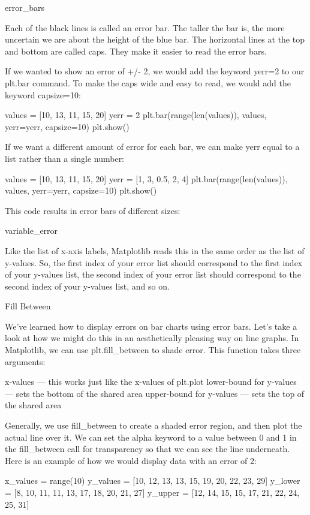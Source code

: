 \documentclass{journal}
\begin{document}
error_bars

Each of the black lines is called an error bar. The taller the bar is, the more uncertain we are about the height of the blue bar. The horizontal lines at the top and bottom are called caps. They make it easier to read the error bars.

If we wanted to show an error of +/- 2, we would add the keyword yerr=2 to our plt.bar command. To make the caps wide and easy to read, we would add the keyword capsize=10:

values = [10, 13, 11, 15, 20]
yerr = 2
plt.bar(range(len(values)), values, yerr=yerr, capsize=10)
plt.show()

If we want a different amount of error for each bar, we can make yerr equal to a list rather than a single number:

values = [10, 13, 11, 15, 20]
yerr = [1, 3, 0.5, 2, 4]
plt.bar(range(len(values)), values, yerr=yerr, capsize=10)
plt.show()

This code results in error bars of different sizes:

variable_error

Like the list of x-axis labels, Matplotlib reads this in the same order as the list of y-values. So, the first index of your error list should correspond to the first index of your y-values list, the second index of your error list should correspond to the second index of your y-values list, and so on.



Fill Between

We’ve learned how to display errors on bar charts using error bars. Let’s take a look at how we might do this in an aesthetically pleasing way on line graphs. In Matplotlib, we can use plt.fill_between to shade error. This function takes three arguments:

    x-values — this works just like the x-values of plt.plot
    lower-bound for y-values — sets the bottom of the shared area
    upper-bound for y-values — sets the top of the shared area

Generally, we use fill_between to create a shaded error region, and then plot the actual line over it. We can set the alpha keyword to a value between 0 and 1 in the fill_between call for transparency so that we can see the line underneath. Here is an example of how we would display data with an error of 2:

x_values = range(10)
y_values = [10, 12, 13, 13, 15, 19, 20, 22, 23, 29]
y_lower = [8, 10, 11, 11, 13, 17, 18, 20, 21, 27]
y_upper = [12, 14, 15, 15, 17, 21, 22, 24, 25, 31]
\end{document}
